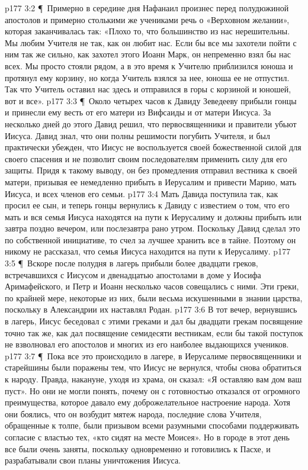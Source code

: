\vs p177 3:2 \P\ Примерно в середине дня Нафанаил произнес перед полудюжиной апостолов и примерно столькими же учениками речь о «Верховном желании», которая заканчивалась так: «Плохо то, что большинство из нас нерешительны. Мы любим Учителя не так, как он любит нас. Если бы все мы захотели пойти с ним так же сильно, как захотел этого Иоанн Марк, он непременно взял бы нас всех. Мы просто стояли рядом, а в это время к Учителю приблизился юноша и протянул ему корзину, но когда Учитель взялся за нее, юноша ее не отпустил. Так что Учитель оставил нас здесь и отправился в горы с корзиной и юношей, вот и все».
\vs p177 3:3 \P\ Около четырех часов к Давиду Зеведееву прибыли гонцы и принесли ему весть от его матери из Вифсаиды и от матери Иисуса. За несколько дней до этого Давид решил, что первосвященники и правители убьют Иисуса. Давид знал, что они полны решимости погубить Учителя, и был практически убежден, что Иисус не воспользуется своей божественной силой для своего спасения и не позволит своим последователям применить силу для его защиты. Придя к такому выводу, он без промедления отправил вестника к своей матери, призывая ее немедленно прибыть в Иерусалим и привести Марию, мать Иисуса, и всех членов его семьи.
\vs p177 3:4 Мать Давида поступила так, как просил ее сын, и теперь гонцы вернулись к Давиду с известием о том, что его мать и вся семья Иисуса находятся на пути к Иерусалиму и должны прибыть или завтра поздно вечером, или послезавтра рано утром. Поскольку Давид сделал это по собственной инициативе, то счел за лучшее хранить все в тайне. Поэтому он никому не рассказал, что семья Иисуса находится на пути к Иерусалиму.
\vs p177 3:5 \P\ Вскоре после полудня в лагерь прибыли более двадцати греков, встречавшихся с Иисусом и двенадцатью апостолами в доме у Иосифа Аримафейского, и Петр и Иоанн несколько часов совещались с ними. Эти греки, по крайней мере, некоторые из них, были весьма искушенными в знании царства, поскольку в Александрии их наставлял Родан.
\vs p177 3:6 В тот вечер, вернувшись в лагерь, Иисус беседовал с этими греками и дал бы двадцати грекам посвящение точно так же, как дал посвящение семидесяти вестникам, если бы такой поступок не взволновал его апостолов и многих из его наиболее выдающихся учеников.
\vs p177 3:7 \P\ Пока все это происходило в лагере, в Иерусалиме первосвященники и старейшины были поражены тем, что Иисус не вернулся, чтобы снова обратиться к народу. Правда, накануне, уходя из храма, он сказал: «Я оставляю вам дом ваш пуст». Но они не могли понять, почему он с готовностью отказался от огромного преимущества, которое давало ему доброжелательное настроение народа. Хотя они боялись, что он возбудит мятеж народа, последние слова Учителя, обращенные к толпе, были призывом всеми разумными способами поддерживать согласие с властью тех, «кто сидят на месте Моисея». Но в городе в этот день все были очень заняты, поскольку одновременно и готовились к Пасхе, и разрабатывали свои планы уничтожения Иисуса.
